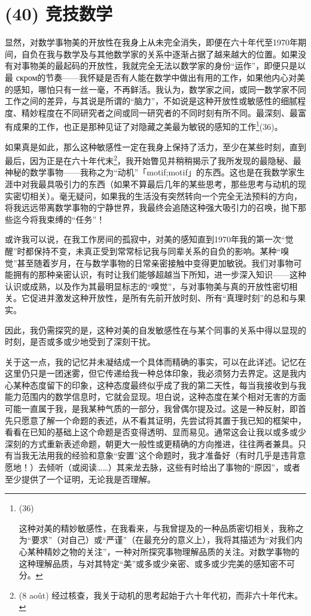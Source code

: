 \section{(40) 竞技数学}

显然，对数学事物美的开放性在我身上从未完全消失，即便在六十年代至1970年期间，自负在我与数学及与其他数学家的关系中逐渐占据了越来越大的位置。如果没有对事物美的最起码的开放性，我就完全无法以数学家的身份``运作''，即便只是以最 скром的节奏——我怀疑是否有人能在数学中做出有用的工作，如果他内心对美的感知，哪怕只有一丝一毫，不再鲜活。我认为，数学家之间，或同一数学家不同工作之间的差异，与其说是所谓的``脑力''，不如说是这种开放性或敏感性的细腻程度、精妙程度在不同研究者之间或同一研究者的不同时刻有所不同。最深刻、最富有成果的工作，也正是那种见证了对隐藏之美最为敏锐的感知的工作\footnote{(36) \par 这种对美的精妙敏感性，在我看来，与我曾提及的一种品质密切相关，我称之为``要求''（对自己）或``严谨''（在最充分的意义上），我将其描述为``对我们内心某种精妙之物的关注''，一种对所探究事物理解品质的关注。对数学事物的这种理解品质，与对其特定``美''或多或少亲密、或多或少完美的感知密不可分。}(36)。

如果真是如此，那么这种敏感性一定在我身上保持了活力，至少在某些时刻，直到最后，因为正是在六十年代末\footnote{(8 août) 经过核查，我关于动机的思考起始于六十年代初，而非六十年代末。}，我开始瞥见并稍稍揭示了我所发现的最隐秘、最神秘的数学事物——我称之为``动机''「motif;motif」的东西。这也是在我数学家生涯中对我最具吸引力的东西（如果不算最后几年的某些思考，那些思考与动机的现实密切相关）。毫无疑问，如果我的生活没有突然转向一个完全无法预料的方向，将我远远带离数学事物的宁静世界，我最终会追随这种强大吸引力的召唤，抛下那些迄今将我束缚的``任务''！

或许我可以说，在我工作房间的孤寂中，对美的感知直到1970年我的第一次``觉醒''时都保持不变，未真正受到常常标记我与同辈关系的自负的影响。某种``嗅觉''甚至随着岁月，在与数学事物的日常亲密接触中变得更加敏锐。我们对事物可能拥有的那种亲密认识，有时让我们能够超越当下所知，进一步深入知识——这种认识或成熟，以及作为其最明显标志的``嗅觉''，与对事物美与真的开放性密切相关。它促进并激发这种开放性，是所有先前开放时刻、所有``真理时刻''的总和与果实。

因此，我仍需探究的是，这种对美的自发敏感性在与某个同事的关系中得以显现的时刻，是否或多或少地受到了深刻干扰。

关于这一点，我的记忆并未凝结成一个具体而精确的事实，可以在此详述。记忆在这里仍只是一团迷雾，但它传递给我一种总体印象，我必须努力去界定。这是我内心某种态度留下的印象，这种态度最终似乎成了我的第二天性，每当我接收到与我能力范围内的数学信息时，它就会显现。坦白说，这种态度在某个相对无害的方面可能一直属于我，是我某种气质的一部分，我曾偶尔提及过。这是一种反射，即首先只愿意了解一个命题的表述，从不看其证明，先尝试将其置于我已知的框架中，看看在已知的基础上这个命题是否变得透明、显而易见。通常这会让我以或多或少深刻的方式重新表述命题，朝更大一般性或更精确的方向推进，往往两者兼具。只有当我无法用我的经验和意象``安置''这个命题时，我才准备好（有时几乎是违背意愿地！）去倾听（或阅读……）其来龙去脉，这些有时给出了事物的``原因''，或者至少提供了一个证明，无论我是否理解。

